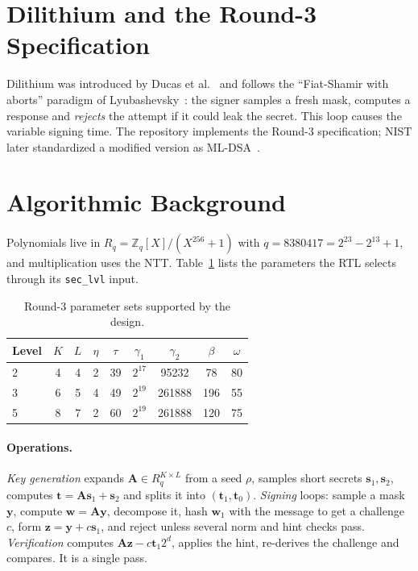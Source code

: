 \documentclass[12pt,a4paper]{report}
\newcommand{\code}[1]{\texttt{#1}}
\begin{document}
\section{Dilithium and the Round-3 Specification}
Dilithium was introduced by Ducas et al.~\cite{spec} and follows the ``Fiat-Shamir with aborts'' paradigm of Lyubashevsky~\cite{lyubashevsky2009}: the signer samples a fresh mask, computes a response and \emph{rejects} the attempt if it could leak the secret. This loop causes the variable signing time. The repository implements the Round-3 specification; NIST later standardized a modified version as ML-DSA~\cite{fips204}.

\section{Algorithmic Background}
Polynomials live in $R_q=\mathbb{Z}_q[X]/(X^{256}+1)$ with $q=8380417=2^{23}-2^{13}+1$, and multiplication uses the NTT. Table~\ref{tab:params} lists the parameters the RTL selects through its \code{sec\_lvl} input.

\begin{table}[H]
\centering
\caption{Round-3 parameter sets supported by the design.}\label{tab:params}
\begin{tabular}{@{}lcccccccc@{}}
\toprule
Level & $K$ & $L$ & $\eta$ & $\tau$ & $\gamma_1$ & $\gamma_2$ & $\beta$ & $\omega$\\
\midrule
2 & 4 & 4 & 2 & 39 & $2^{17}$ & 95232  & 78  & 80\\
3 & 6 & 5 & 4 & 49 & $2^{19}$ & 261888 & 196 & 55\\
5 & 8 & 7 & 2 & 60 & $2^{19}$ & 261888 & 120 & 75\\
\bottomrule
\end{tabular}
\end{table}

\paragraph{Operations.}
\emph{Key generation} expands $\mathbf{A}\in R_q^{K\times L}$ from a seed $\rho$, samples short secrets $\mathbf{s}_1,\mathbf{s}_2$, computes $\mathbf{t}=\mathbf{A}\mathbf{s}_1+\mathbf{s}_2$ and splits it into $(\mathbf{t}_1,\mathbf{t}_0)$. \emph{Signing} loops: sample a mask $\mathbf{y}$, compute $\mathbf{w}=\mathbf{A}\mathbf{y}$, decompose it, hash $\mathbf{w}_1$ with the message to get a challenge $c$, form $\mathbf{z}=\mathbf{y}+c\mathbf{s}_1$, and reject unless several norm and hint checks pass. \emph{Verification} computes $\mathbf{A}\mathbf{z}-c\mathbf{t}_1 2^d$, applies the hint, re-derives the challenge and compares. It is a single pass.
\end{document}
